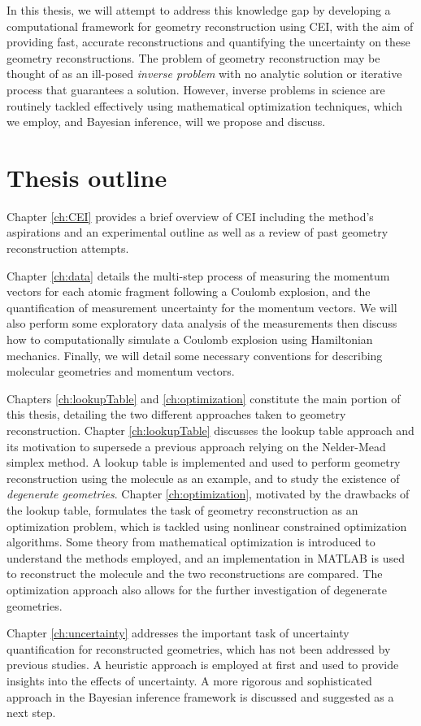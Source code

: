 In this thesis, we will attempt to address this knowledge gap by developing a computational framework for geometry reconstruction using CEI, with the aim of providing fast, accurate reconstructions and quantifying the uncertainty on these geometry reconstructions. The problem of geometry reconstruction may be thought of as an ill-posed \emph{inverse problem} with no analytic solution or iterative process that guarantees a solution. However, inverse problems in science are routinely tackled effectively using mathematical optimization techniques, which we employ, and Bayesian inference, will we propose and discuss.

\section*{Thesis outline}
Chapter \ref{ch:CEI} provides a brief overview of CEI including the method's aspirations and an experimental outline as well as a review of past geometry reconstruction attempts.

Chapter \ref{ch:data} details the multi-step process of measuring the momentum vectors for each atomic fragment following a Coulomb explosion, and the quantification of measurement uncertainty for the momentum vectors. We will also perform some exploratory data analysis of the measurements then discuss how to computationally simulate a Coulomb explosion using Hamiltonian mechanics. Finally, we will detail some necessary conventions for describing molecular geometries and momentum vectors.

Chapters \ref{ch:lookupTable} and \ref{ch:optimization} constitute the main portion of this thesis, detailing the two different approaches taken to geometry reconstruction. Chapter \ref{ch:lookupTable} discusses the lookup table approach and its motivation to supersede a previous approach relying on the Nelder-Mead simplex method. A lookup table is implemented and used to perform geometry reconstruction using the  molecule as an example, and to study the existence of \emph{degenerate geometries}. Chapter \ref{ch:optimization}, motivated by the drawbacks of the lookup table, formulates the task of geometry reconstruction as an optimization problem, which is tackled using nonlinear constrained optimization algorithms. Some theory from mathematical optimization is introduced to understand the methods employed, and an implementation in MATLAB is used to reconstruct the  molecule and the two reconstructions are compared. The optimization approach also allows for the further investigation of degenerate geometries.

Chapter \ref{ch:uncertainty} addresses the important task of uncertainty quantification for reconstructed geometries, which has not been addressed by previous studies. A heuristic approach is employed at first and used to provide insights into the effects of uncertainty. A more rigorous and sophisticated approach in the Bayesian inference framework is discussed and suggested as a next step.
